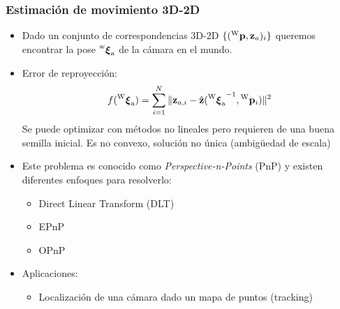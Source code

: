 \begin{frame}
    \frametitle{Estimación de movimiento 3D-2D}
    \footnotesize
    
    \begin{itemize}
        \item Dado un conjunto de correspondencias 3D-2D $\{(\prescript{\mathrm{\mathrm{W}}}{}{\boldsymbol{\mathbf{p}}}, \boldsymbol{\mathbf{z}}_{a})_{i}\}$ queremos encontrar la pose $\prescript{\mathrm{w}}{}{{\boldsymbol{\mathbf{\xi}}}_\mathrm{a}}$ de la cámara en el mundo.
        \item Error de reproyección:
        \[
        f(\prescript{\mathrm{\mathrm{W}}}{}{{\boldsymbol{\mathbf{\xi}}}_\mathrm{a}})= \sum_{i=1}^{N} \Vert \boldsymbol{\mathbf{z}}_{a,i} - \hat{\boldsymbol{\mathbf{z}}}({\prescript{\mathrm{\mathrm{W}}}{}{{\boldsymbol{\mathbf{\xi}}}_\mathrm{a}}}^{-1},\prescript{\mathrm{\mathrm{W}}}{}{\boldsymbol{\mathbf{p}}}_{i}) \Vert^{2}
        \]
        Se puede optimizar con métodos no lineales pero requieren de una buena semilla inicial. Es no convexo, solución no única (ambigüedad de escala)
        \item Este problema es conocido como \emph{Perspective-n-Points} (PnP) y existen diferentes enfoques para resolverlo:
        \begin{itemize}
            \item Direct Linear Transform (DLT)
            \item EPnP
            \item OPnP
        \end{itemize}
        \item Aplicaciones:
        \begin{itemize}
            \item Localización de una cámara dado un mapa de puntos (tracking)
        \end{itemize}
    \end{itemize}
    
\end{frame}


